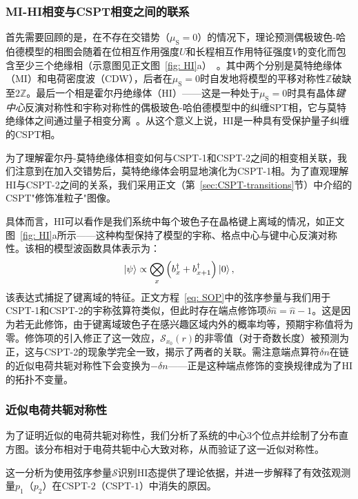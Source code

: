 \documentclass[preprint,superscriptaddress,floatfix, nofootinbib]{revtex4-2}
\begin{document}
\subsubsection*{MI-HI相变与CSPT相变之间的联系}

首先需要回顾的是，在不存在交错势（$\mu_{\text{S}} = 0$）的情况下，理论预测偶极玻色-哈伯德模型的相图会随着在位相互作用强度$U$和长程相互作用特征强度$V$的变化而包含至少三个绝缘相（示意图见正文图~\ref{fig: HI}a）~\cite{Torre2006, Berg2008}。其中两个分别是莫特绝缘体（MI）和电荷密度波（CDW），后者在$\mu_{\text{S}} = 0$时自发地将模型的平移对称性$\mathbb{Z}$破缺至$2\mathbb{Z}$。最后一个相是霍尔丹绝缘体（HI）——这是一种处于$\mu_{\text{S}} = 0$时具有晶体\textit{键中心}反演对称性和宇称对称性的偶极玻色-哈伯德模型中的纠缠SPT相，它与莫特绝缘体之间通过量子相变分离~\cite{Pollmann2010}。从这个意义上说，HI是一种具有受保护量子纠缠的CSPT相。

为了理解霍尔丹-莫特绝缘体相变如何与CSPT-1和CSPT-2之间的相变相关联\cite{Sahay2025}，我们注意到在加入交错势后，莫特绝缘体会明显地演化为CSPT-1相。为了直观理解HI与CSPT-2之间的关系，我们采用正文（第~\ref{sec:CSPT-transitions}节）中介绍的CSPT"修饰准粒子"图像。

具体而言，HI可以看作是我们系统中每个玻色子在晶格键上离域的情况，如正文图~\ref{fig: HI}a所示——这种构型保持了模型的宇称、格点中心与键中心反演对称性。该相的模型波函数具体表示为：
\begin{equation} \label{eq:model-wavefunction}
    \ket{\psi} \propto \bigotimes_{x} \left( b_{x}^{\dagger} + b_{x + 1}^{\dagger} \right) \ket{0},
\end{equation}
该表达式捕捉了键离域的特征。正文方程~\eqref{eq: SOP}中的弦序参量与我们用于CSPT-1和CSPT-2的宇称弦算符类似，但此时存在端点修饰项$\delta \hat n = \hat n-1$。这是因为若无此修饰，由于键离域玻色子在感兴趣区域内外的概率均等，预期宇称值将为零。修饰项的引入修正了这一效应，$\mathcal{S}_{x_0} (r)$的非零值（对于奇数长度）被预测为正，这与CSPT-2的现象学完全一致，揭示了两者的关联。需注意端点算符$\delta n$在链的近似电荷共轭对称性下会变换为$-\delta n$——正是这种端点修饰的变换规律成为了HI的拓扑不变量\cite{Pollmann2012, Schuch2011, Chen2011}。
\subsubsection*{近似电荷共轭对称性}
为了证明近似的电荷共轭对称性，我们分析了系统的中心3个位点并绘制了分布直方图。该分布相对于电荷共轭中心大致对称，从而验证了这一近似对称性。

这一分析为使用弦序参量$\mathcal{S}$识别HI态提供了理论依据，并进一步解释了有效弦观测量$p_1$（$p_2$）在CSPT-$2$（CSPT-$1$）中消失的原因。
\end{document}
